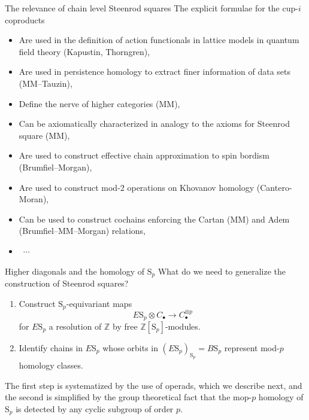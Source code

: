 \documentclass[10pt,t]{beamer}
\renewcommand{\S}{\mathrm{S}}
\begin{document}
\begin{frame}{The relevance of chain level Steenrod squares}
	The explicit formulae for the cup-$i$ coproducts	
	\begin{itemize}
		\item Are used in the definition of action functionals in lattice models in quantum field theory (Kapustin, Thorngren), \pause
		\item Are used in persistence homology to extract finer information of data sets (MM--Tauzin), \pause
		\item Define the nerve of higher categories (MM), \pause
		\item Can be axiomatically characterized in analogy to the axioms for Steenrod square (MM), \pause
		\item Are used to construct effective chain approximation to spin bordism (Brumfiel--Morgan), \pause
		\item Are used to construct mod-2 operations on Khovanov homology (Cantero-Moran), \pause
		\item Can be used to construct cochains enforcing the Cartan (MM) and Adem (Brumfiel--MM--Morgan) relations,
		\item \ $\cdots$
	\end{itemize}
\end{frame}


\begin{frame}{Higher diagonals and the homology of $\S_p$}
	What do we need to generalize the construction of Steenrod squares?
	
	\pause \vspace{10pt}
	
	\begin{enumerate}
		\item Construct $\S_p$-equivariant maps
		\begin{equation*}
		E\S_p \otimes C_\bullet \to C_\bullet^{\otimes p}
		\end{equation*}
		for $E\S_p$ a resolution of $\mathbb Z$ by free $\mathbb Z[\S_p]$-modules.
		\vspace*{10pt} \pause
		\item Identify chains in $E\S_p$ whose orbits in $(E\S_p)_{\S_p} = B\S_p$ represent mod-$p$ homology classes.
	\end{enumerate}

	\vspace*{10pt}\pause

	The first step is systematized by the use of operads, which we describe next, and the second is simplified by the group theoretical fact that the mop-$p$ homology of $\S_p$ is detected by any cyclic subgroup of order $p$.
\end{frame}
\end{document}
